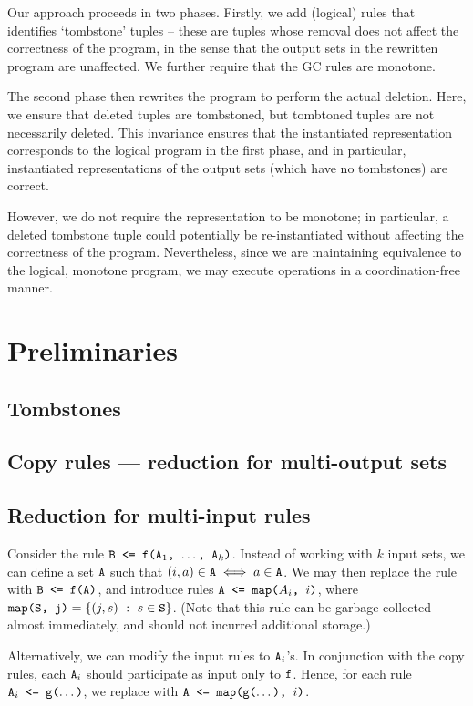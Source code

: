 \documentclass[10pt]{proc}
\numberwithin{equation}{section}
\renewcommand{\tt}[1]{\ifmmode\text{\texttt{#1}}\else\texttt{#1}\fi}
\begin{document}
Our approach proceeds in two phases.
Firstly, we add (logical) rules that identifies `tombstone' tuples -- these are tuples whose removal does not affect the correctness of the program, in the sense that the output sets in the rewritten program are unaffected.
We further require that the GC rules are monotone.

The second phase then rewrites the program to perform the actual deletion.
Here, we ensure that deleted tuples are tombstoned, but tombtoned tuples are not necessarily deleted.
This invariance ensures that the instantiated representation corresponds to the logical program in the first phase, and in particular, instantiated representations of the output sets (which have no tombstones) are correct.

However, we do not require the representation to be monotone; in particular, a deleted tombstone tuple could potentially be re-instantiated without affecting the correctness of the program.
Nevertheless, since we are maintaining equivalence to the logical, monotone program, we may execute operations in a coordination-free manner.

\section{Preliminaries}
\subsection{Tombstones}
\subsection{Copy rules --- reduction for multi-output sets}
\subsection{Reduction for multi-input rules}
Consider the rule $\tt{B <= f(A$_1$, $\dots$, A$_k$)}$.
Instead of working with $k$ input sets, we can define a set $\tt{A}$ such that $(i, a) \in \tt{A} \iff a \in \tt{A}$.
We may then replace the rule with $\tt{B <= f(A)}$, and introduce rules $\tt{A <= map($A_i$, $i$)}$, where $\tt{map(S, j)} = \{(j, s) ~:~ s\in \tt{S}\}$.
(Note that this rule can be garbage collected almost immediately, and should not incurred additional storage.)

Alternatively, we can modify the input rules to $\tt{A}_i$'s.
In conjunction with the copy rules, each $\tt{A}_i$ should participate as input only to $\tt{f}$.
Hence, for each rule $\tt{A}_i \tt{ <= } \tt{g($\dots$)}$, we replace with $\tt{A} \tt{ <= } \tt{map(g($\dots$), $i$)}$.
\end{document}
